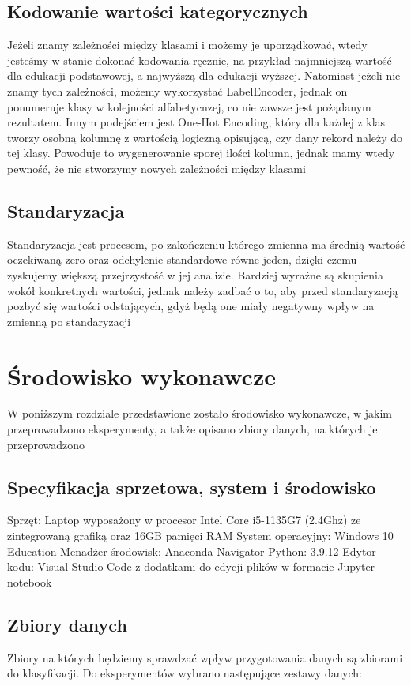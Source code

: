 \documentclass{book}
\begin{document}
\section{Kodowanie wartości kategorycznych}
Jeżeli znamy zależności między klasami i możemy je uporządkować, 
wtedy jesteśmy w stanie dokonać kodowania ręcznie, na przykład 
najmniejszą wartość dla edukacji podstawowej, a najwyższą dla 
edukacji wyższej. Natomiast jeżeli nie znamy tych zależności, 
możemy wykorzystać LabelEncoder, jednak on ponumeruje klasy w 
kolejności alfabetycnzej, co nie zawsze jest pożądanym rezultatem. 
Innym podejściem jest One-Hot Encoding, który dla każdej z klas 
tworzy osobną kolumnę z wartością logiczną opisującą, czy dany 
rekord należy do tej klasy. Powoduje to wygenerowanie sporej 
ilości kolumn, jednak mamy wtedy pewność, że nie stworzymy 
nowych zależności między klasami
\section{Standaryzacja}
Standaryzacja jest procesem, po zakończeniu którego zmienna 
ma średnią wartość oczekiwaną zero oraz odchylenie standardowe 
równe jeden, dzięki czemu zyskujemy większą przejrzystość w 
jej analizie. Bardziej wyraźne są skupienia wokół konkretnych 
wartości, jednak należy zadbać o to, aby przed standaryzacją 
pozbyć się wartości odstających, gdyż będą one miały negatywny 
wpływ na zmienną po standaryzacji



\chapter{Środowisko wykonawcze}

W poniższym rozdziale przedstawione zostało środowisko wykonawcze, 
w jakim przeprowadzono eksperymenty, a także opisano zbiory danych, 
na których je przeprowadzono
\section{Specyfikacja sprzetowa, system i środowisko}
Sprzęt: Laptop wyposażony w procesor Intel Core i5-1135G7 
(2.4Ghz) ze zintegrowaną grafiką oraz 16GB pamięci RAM
System operacyjny: Windows 10 Education
Menadżer środowisk: Anaconda Navigator
Python: 3.9.12
Edytor kodu: Visual Studio Code z dodatkami do edycji plików w 
formacie Jupyter notebook
\section{Zbiory danych}
Zbiory na których będziemy sprawdzać wpływ przygotowania danych 
są zbiorami do klasyfikacji. Do eksperymentów wybrano następujące 
zestawy danych:
\end{document}
